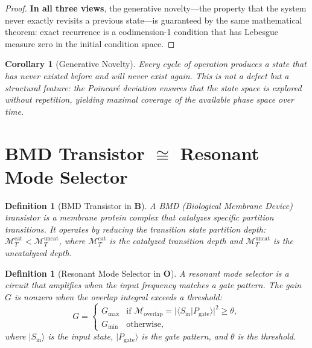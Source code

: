 \documentclass[twocolumn,10pt]{article}
\newtheorem{corollary}[theorem]{Corollary}
\newtheorem{definition}[theorem]{Definition}
\theoremstyle{remark}
\newcommand{\Depth}{\mathcal{M}}
\newcommand{\CatO}{\mathbf{O}}
\newcommand{\CatB}{\mathbf{B}}
\begin{document}
\begin{proof}
\textbf{In all three views}, the generative novelty---the property that the system never exactly revisits a previous state---is guaranteed by the same mathematical theorem: exact recurrence is a codimension-1 condition that has Lebesgue measure zero in the initial condition space.
\end{proof}

\begin{corollary}[Generative Novelty]
\label{cor:generative_novelty}
Every cycle of operation produces a state that has never existed before and will never exist again.
This is not a defect but a structural feature: the Poincar\'{e} deviation ensures that the state space is explored without repetition, yielding maximal coverage of the available phase space over time.
\end{corollary}

\section{\texorpdfstring{BMD Transistor $\cong$ Resonant Mode Selector}{BMD Transistor = Resonant Mode Selector}}
\label{sec:bmd}

\begin{definition}[BMD Transistor in $\CatB$]
\label{def:bmd_B}
A \emph{BMD (Biological Membrane Device) transistor} is a membrane protein complex that catalyzes specific partition transitions.
It operates by reducing the transition state partition depth: $\Depth_T^{\mathrm{cat}} < \Depth_T^{\mathrm{uncat}}$, where $\Depth_T^{\mathrm{cat}}$ is the catalyzed transition depth and $\Depth_T^{\mathrm{uncat}}$ is the uncatalyzed depth.
\end{definition}

\begin{definition}[Resonant Mode Selector in $\CatO$]
\label{def:bmd_O}
A \emph{resonant mode selector} is a circuit that amplifies when the input frequency matches a gate pattern.
The gain $G$ is nonzero when the overlap integral exceeds a threshold:
\begin{equation}
G = \begin{cases} G_{\max} & \text{if } \mathcal{M}_{\mathrm{overlap}} = |\langle S_{\mathrm{in}} | P_{\mathrm{gate}}\rangle|^2 \geq \theta, \\ G_{\min} & \text{otherwise}, \end{cases}
\label{eq:bmd_gain}
\end{equation}
where $|S_{\mathrm{in}}\rangle$ is the input state, $|P_{\mathrm{gate}}\rangle$ is the gate pattern, and $\theta$ is the threshold.
\end{definition}
\end{document}
